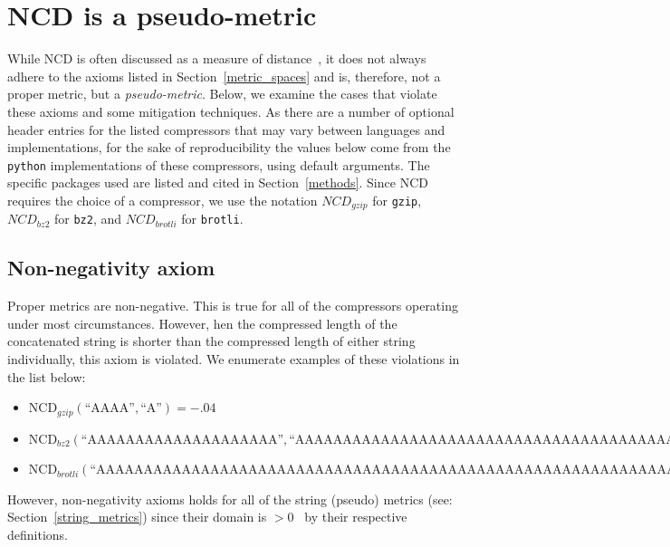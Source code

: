 \documentclass[preprint,12pt]{elsarticle}
\begin{document}
\section{NCD is a pseudo-metric}
\label{pseudometric}

While NCD is often discussed as a measure of distance~\cite{opitz2023gzip,weinreich2023parameter,nishida2011tweet,jiang2022less,ncd}, it does not always adhere to the axioms listed in Section~\ref{metric_spaces} and is, therefore, not a proper metric, but a \textit{pseudo-metric}. 
Below, we examine the cases that violate these axioms and some mitigation techniques. 
As there are a number of optional header entries for the listed compressors that may vary between languages and implementations, for the sake of reproducibility the values below come from the \texttt{python} implementations of these compressors, using default arguments. 
The specific packages used are listed and cited in Section~\ref{methods}. 
Since NCD requires the choice of a compressor, we use the notation $NCD_{gzip}$ for \texttt{gzip}, $NCD_{bz2}$ for \texttt{bz2}, and $NCD_{brotli}$ for \texttt{brotli}. 


\subsection{Non-negativity axiom} 
Proper metrics are non-negative. 
This is true for all of the compressors operating under most circumstances. 
However, hen the compressed length of the concatenated string is shorter than the compressed length of either string individually, this axiom is violated.
We enumerate examples of these violations in the list below:
\begin{itemize}
    \item $\text{NCD}_{gzip}(\text{``AAAA''}, \text{``A''}) = -.04$
    \item $\text{NCD}_{bz2}(\text{``AAAAAAAAAAAAAAAAAAAA''},\text{``AAAAAAAAAAAAAAAAAAAAAAAAAAAAAAAAAAAAAAAAAAAAAAAAAA''}) = -.05$
    \item $\text{NCD}_{brotli}(\text{``AAAAAAAAAAAAAAAAAAAAAAAAAAAAAAAAAAAAAAAAAAAAAAAAAAAAAAAAAAAAAAAAAAAAAAAAAAAAAAAAAA''}, \text{``AAAAAAAAAAAAAAAAAAAAAAAAAAAAAAAAAAAAAAAAAAAAAAAAAAAAAAAAAAAAAAAAAAAAAAAAAAAA''}) = -.17$
\end{itemize}
However, non-negativity axioms holds for all of the string (pseudo) metrics (see: Section~\ref{string_metrics}) since their domain is $>0$~\cite{metrics,levenshtein} by their respective definitions.
\end{document}
